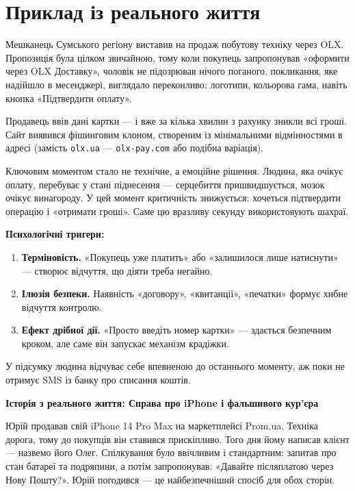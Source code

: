 \newpage 

\section{Приклад із реального життя}

Мешканець Сумського регіону виставив на продаж побутову техніку через OLX. Пропозиція була цілком звичайною, тому коли покупець запропонував «оформити через OLX Доставку», чоловік не підозрював нічого поганого. покликання, яке надійшло в месенджері, виглядало переконливо: логотипи, кольорова гама, навіть кнопка «Підтвердити оплату».

Продавець ввів дані картки — і вже за кілька хвилин з рахунку зникли всі гроші. Сайт виявився фішинговим клоном, створеним із мінімальними відмінностями в адресі (замість \texttt{olx.ua} — \texttt{olx-pay.com} або подібна варіація).

Ключовим моментом стало не технічне, а емоційне рішення. Людина, яка очікує оплату, перебуває у стані піднесення — серцебиття пришвидшується, мозок очікує винагороду. У цей момент критичність знижується: хочеться підтвердити операцію і «отримати гроші». Саме цю вразливу секунду використовують шахраї.

\vspace{0.3cm}
\noindent\textbf{Психологічні тригери:}

\begin{enumerate}
    \item \textbf{Терміновість.} «Покупець уже платить» або «залишилося лише натиснути» — створює відчуття, що діяти треба негайно.
    \item \textbf{Ілюзія безпеки.} Наявність «договору», «квитанції», «печатки» формує хибне відчуття контролю.
    \item \textbf{Ефект дрібної дії.} «Просто введіть номер картки» — здається безпечним кроком, але саме він запускає механізм крадіжки.
\end{enumerate}

У підсумку людина відчуває себе впевненою до останнього моменту, аж поки не отримує SMS із банку про списання коштів.

\vspace{0.3cm}\noindent\textbf{Історія з реального життя: Справа про iPhone і фальшивого кур'єра}

Юрій продавав свій iPhone 14 Pro Max на маркетплейсі Prom.ua. Техніка дорога, тому до покупців він ставився прискіпливо. Того дня йому написав клієнт — назвемо його Олег. Спілкування було ввічливим і стандартним: запитав про стан батареї та подряпини, а потім запропонував: «Давайте післяплатою через Нову Пошту?». Юрій погодився — це найбезпечніший спосіб для обох сторін.

